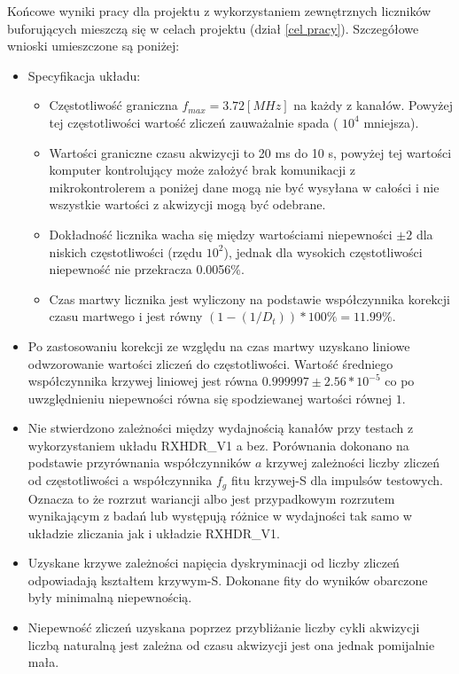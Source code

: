 Końcowe wyniki pracy dla projektu z wykorzystaniem zewnętrznych liczników buforujących mieszczą się w celach projektu (dział \ref{cel pracy}). Szczegółowe wnioski umieszczone są poniżej:
\begin{itemize}
        \item Specyfikacja układu:
        \begin{itemize}
                \item Częstotliwość graniczna $f_{max} = 3.72 [MHz]$ na każdy z kanałów. Powyżej tej częstotliwości wartość zliczeń zauważalnie spada ( $10^4$ mniejsza).
                \item Wartości graniczne czasu akwizycji to 20 ms do 10 s, powyżej tej wartości komputer kontrolujący może założyć brak komunikacji z mikrokontrolerem a poniżej dane mogą nie być wysyłana w całości i nie wszystkie wartości z akwizycji mogą być odebrane. 
                \item Dokładność licznika wacha się między wartościami niepewności $\pm 2$ dla niskich częstotliwości (rzędu $10^{2}$), jednak dla wysokich częstotliwości niepewność nie przekracza 0.0056\%.
                \item Czas martwy licznika jest wyliczony na podstawie współczynnika korekcji czasu martwego i jest równy $(1-(1/D_t))* 100\% = 11.99 \%$.
        \end{itemize}
        \item Po zastosowaniu korekcji ze względu na czas martwy uzyskano liniowe odwzorowanie wartości zliczeń do częstotliwości. Wartość średniego współczynnika krzywej liniowej jest równa $ 0.999997 \pm 2.56 * 10^{-5}$ co po uwzględnieniu niepewności równa się spodziewanej wartości równej $1$.
        \item Nie stwierdzono zależności między wydajnością kanałów przy testach z wykorzystaniem układu RXHDR\_V1 a bez. Porównania dokonano na podstawie przyrównania współczynników $a$ krzywej zależności liczby zliczeń od częstotliwości a współczynnika $f_g$ fitu krzywej-S dla impulsów testowych. Oznacza to że rozrzut wariancji albo jest przypadkowym rozrzutem wynikającym z badań lub występują różnice w wydajności tak samo w układzie zliczania jak i układzie RXHDR\_V1.
        \item Uzyskane krzywe zależności napięcia dyskryminacji od liczby zliczeń odpowiadają kształtem krzywym-S. Dokonane fity do wyników obarczone były minimalną niepewnością.     
        \item Niepewność zliczeń uzyskana poprzez przybliżanie liczby cykli akwizycji liczbą naturalną jest zależna od czasu akwizycji jest ona jednak pomijalnie mała. 
\end{itemize}


